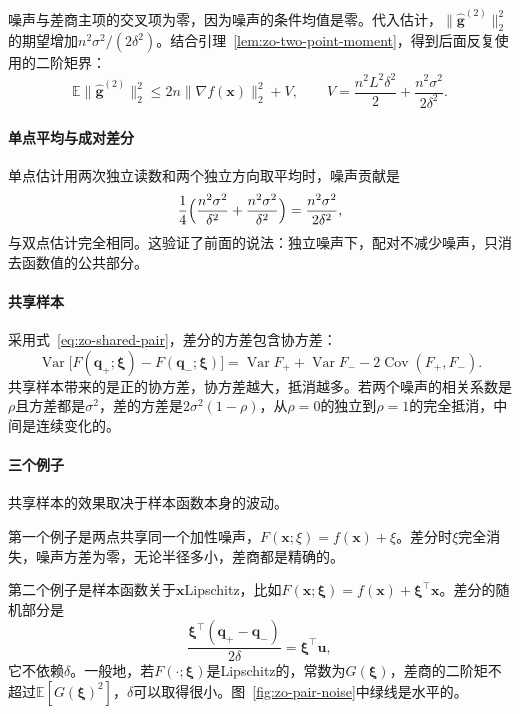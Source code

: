 噪声与差商主项的交叉项为零，因为噪声的条件均值是零。代入估计，$\lVert\hat{\bm{g}}^{(2)}\rVert_2^2$的期望增加$n^2\sigma^2/(2\delta^2)$。结合引理~\ref{lem:zo-two-point-moment}，得到后面反复使用的二阶矩界：
\begin{equation}
 \mathbb{E}\lVert\hat{\bm{g}}^{(2)}\rVert_2^2\leq2n\lVert\nabla f(\bm{x})\rVert_2^2+V,\qquad
 V=\frac{n^2L^2\delta^2}{2}+\frac{n^2\sigma^2}{2\delta^2}.
 \label{eq:zo-noisy-moment}
\end{equation}

\paragraph{单点平均与成对差分}
单点估计用两次独立读数和两个独立方向取平均时，噪声贡献是
\[
 \frac14\Bigl(\frac{n^2\sigma^2}{\delta^2}+\frac{n^2\sigma^2}{\delta^2}\Bigr)=\frac{n^2\sigma^2}{2\delta^2},
\]
与双点估计完全相同。这验证了前面的说法：独立噪声下，配对不减少噪声，只消去函数值的公共部分。

\paragraph{共享样本}
采用式~\eqref{eq:zo-shared-pair}，差分的方差包含协方差：
\begin{equation}
 \operatorname{Var}\bigl[F(\bm{q}_+;\bm{\xi})-F(\bm{q}_-;\bm{\xi})\bigr]
 =\operatorname{Var}F_++\operatorname{Var}F_--2\operatorname{Cov}(F_+,F_-).
 \label{eq:zo-shared-variance}
\end{equation}
共享样本带来的是正的协方差，协方差越大，抵消越多。若两个噪声的相关系数是$\rho$且方差都是$\sigma^2$，差的方差是$2\sigma^2(1-\rho)$，从$\rho=0$的独立到$\rho=1$的完全抵消，中间是连续变化的。

\paragraph{三个例子}
共享样本的效果取决于样本函数本身的波动。

第一个例子是两点共享同一个加性噪声，$F(\bm{x};\xi)=f(\bm{x})+\xi$。差分时$\xi$完全消失，噪声方差为零，无论半径多小，差商都是精确的。

第二个例子是样本函数关于$\bm{x}$Lipschitz，比如$F(\bm{x};\bm{\xi})=f(\bm{x})+\bm{\xi}^\top\bm{x}$。差分的随机部分是
\[
 \frac{\bm{\xi}^\top(\bm{q}_+-\bm{q}_-)}{2\delta}=\bm{\xi}^\top\bm{u},
\]
它不依赖$\delta$。一般地，若$F(\cdot;\bm{\xi})$是Lipschitz的，常数为$G(\bm{\xi})$，差商的二阶矩不超过$\mathbb{E}[G(\bm{\xi})^2]$，$\delta$可以取得很小。图~\ref{fig:zo-pair-noise}中绿线是水平的。

